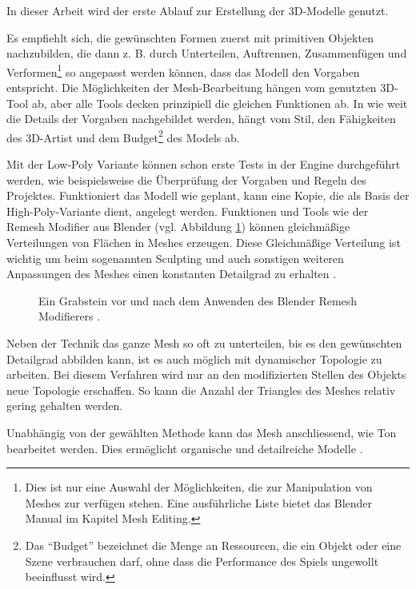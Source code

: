 \par
In dieser Arbeit wird der erste Ablauf zur Erstellung der 3D-Modelle genutzt.
\par
Es empfiehlt sich, die gewünschten Formen zuerst mit primitiven Objekten nachzubilden, die dann z. B. durch Unterteilen, Auftrennen, Zusammenfügen und Verformen\footnote{Dies ist nur eine Auswahl der Möglichkeiten, die zur Manipulation von Meshes zur verfügen stehen. Eine ausführliche Liste bietet das Blender Manual \parencite{blendermanual} im Kapitel Mesh Editing.} so angepasst werden können, dass das Modell den Vorgaben entspricht. Die Möglichkeiten der Mesh-Bearbeitung hängen vom genutzten 3D-Tool ab, aber alle Tools decken prinzipiell die gleichen Funktionen ab.
\newpage
In wie weit die Details der Vorgaben nachgebildet werden, hängt vom Stil, den Fähigkeiten des 3D-Artist und dem Budget\footnote{Das \enquote{Budget} bezeichnet die Menge an Ressourcen, die ein Objekt oder eine Szene verbrauchen darf, ohne dass die Performance des Spiels ungewollt beeinflusst wird.} des Models ab.
\par
Mit der Low-Poly Variante können schon erste Tests in der Engine durchgeführt werden, wie beispielsweise die Überprüfung der Vorgaben und Regeln des Projektes. Funktioniert das Modell wie geplant, kann eine Kopie, die als Basis der High-Poly-Variante dient, angelegt werden. Funktionen und Tools wie der Remesh Modifier aus Blender (vgl. Abbildung \ref{remesh}) können gleichmäßige Verteilungen von Flächen in Meshes erzeugen. Diese Gleichmäßige Verteilung ist wichtig um beim sogenannten Sculpting und auch sonstigen weiteren Anpassungen des Meshes einen konstanten Detailgrad zu erhalten \parencite{Grabstein}.
\begin{figure}[H]
\centering
  \caption{Ein Grabstein vor und nach dem Anwenden des Blender Remesh Modifierers \parencite{Grabstein}.}
\label{remesh}
\end{figure}
Neben der Technik das ganze Mesh so oft zu unterteilen, bis es den gewünschten Detailgrad abbilden kann, ist es auch möglich mit dynamischer Topologie zu arbeiten. Bei diesem Verfahren wird nur an den modifizierten Stellen des Objekts neue Topologie erschaffen. So kann die Anzahl der Triangles des Meshes relativ gering gehalten werden.
\par
Unabhängig von der gewählten Methode kann das Mesh anschliessend, wie Ton bearbeitet werden. Dies ermöglicht organische und detailreiche Modelle \parencite[S.\,172-189]{blender}.

